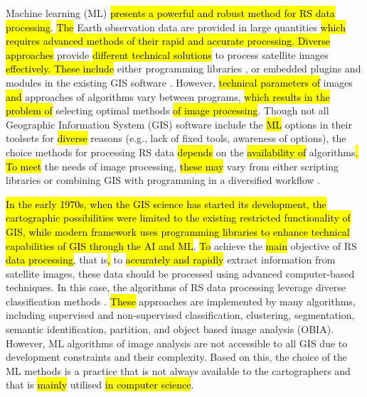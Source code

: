 \documentclass[final,5p,times,twocolumn]{elsarticle}
\begin{document}
Machine learning (ML)\hl{ presents a powerful and robust method for RS data processing}. \hl{The }Earth observation data are provided in large quantities\hl{ which requires advanced methods of their rapid and accurate processing}\cite{LI2023103345,YIN2021102514,HUANG20181915}\hl{. Diverse approaches }provide \hl{different technical solutions } to process satellite images\hl{ effectively. These include} either programming libraries \cite{9884758,Lemenkova202306,9297369,9553880}, or embedded plugins and modules in the existing GIS software \cite{Lemenkova202307,rs15041148}. However, \hl{technical parameters of} images \hl{and} approaches of algorithms vary\hl{ }between programs, \hl{which results in the problem of} selecting optimal methods \hl{of image processing}. Though not all Geographic Information System (GIS) software include the \hl{ML} options in their toolsets for \hl{diverse} reasons (e.g., lack of fixed tools, awareness of options), the choice methods for processing RS data \hl{depends} on the \hl{availability of} algorithms\hl{. To meet }the needs of image processing, \hl{these may} vary\hl{ }from either scripting libraries or combining GIS with programming in a\hl{ }diversified workflow \citep{5070195,Lemenkova202227,4736879,6049966,Lemenkova202301,6910592}.

\hl{In the early 1970s, when the GIS science has started its development, the cartographic possibilities were limited to the existing restricted functionality of GIS, while modern framework uses programming libraries to enhance technical capabilities of GIS through the AI and ML}. \hl{To} achieve the \hl{main }objective of RS \hl{data processing}, that is\hl{, }to \hl{accurately and rapidly }extract information from satellite images, these data should be processed using advanced computer-based techniques. In this case, the algorithms of RS data processing leverage diverse classification methods\hl{ }\cite{su151813786,Lemenkova202229}. \hl{These} approaches\hl{ }are implemented by many algorithms, including supervised and non-supervised classification, clustering, segmentation, semantic identification, partition, and object based image analysis (OBIA). However, ML algorithms of image analysis are not accessible to all GIS due to development constraints and their complexity. Based on this, the choice of the ML methods is a practice that is not always available to the cartographers and that is \hl{mainly }utilised \hl{in computer science}.
\end{document}
